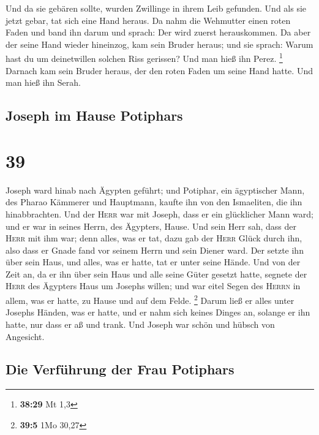  Und da sie gebären sollte, wurden Zwillinge in ihrem
Leib gefunden.  Und als sie jetzt gebar, tat sich eine
Hand heraus. Da nahm die Wehmutter einen roten Faden und band ihn darum
und sprach: Der wird zuerst herauskommen.  Da aber der
seine Hand wieder hineinzog, kam sein Bruder heraus; und sie sprach:
Warum hast du um deinetwillen solchen Riss gerissen? Und man hieß ihn
Perez. \footnote{\textbf{38:29} Mt 1,3}  Darnach kam sein
Bruder heraus, der den roten Faden um seine Hand hatte. Und man hieß ihn
Serah.

\hypertarget{joseph-im-hause-potiphars}{%
\subsection{Joseph im Hause Potiphars}\label{joseph-im-hause-potiphars}}

\hypertarget{section-38}{%
\section{39}\label{section-38}}

 Joseph ward hinab nach Ägypten geführt; und Potiphar, ein
ägyptischer Mann, des Pharao Kämmerer und Hauptmann, kaufte ihn von den
Ismaeliten, die ihn hinabbrachten.  Und der \textsc{Herr}
war mit Joseph, dass er ein glücklicher Mann ward; und er war in seines
Herrn, des Ägypters, Hause.  Und sein Herr sah, dass der
\textsc{Herr} mit ihm war; denn alles, was er tat, dazu gab der
\textsc{Herr} Glück durch ihn,  also dass er Gnade fand
vor seinem Herrn und sein Diener ward. Der setzte ihn über sein Haus,
und alles, was er hatte, tat er unter seine Hände.  Und
von der Zeit an, da er ihn über sein Haus und alle seine Güter gesetzt
hatte, segnete der \textsc{Herr} des Ägypters Haus um Josephs willen;
und war eitel Segen des \textsc{Herrn} in allem, was er hatte, zu Hause
und auf dem Felde. \footnote{\textbf{39:5} 1Mo 30,27} 
Darum ließ er alles unter Josephs Händen, was er hatte, und er nahm sich
keines Dinges an, solange er ihn hatte, nur dass er aß und trank. Und
Joseph war schön und hübsch von Angesicht.

\hypertarget{die-verfuxfchrung-der-frau-potiphars}{%
\subsection{Die Verführung der Frau
Potiphars}\label{die-verfuxfchrung-der-frau-potiphars}}

